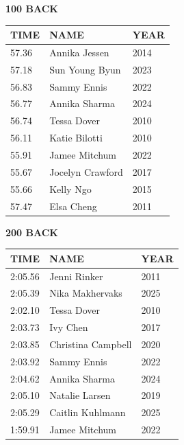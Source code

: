 \begin{table}[H]
\centering
\begin{minipage}[t]{0.48\textwidth}
\centering
\textbf{100 BACK}\\[0.1cm]
\begin{tabular}{@{}p{1.8cm}p{2.8cm}p{1.2cm}@{}}
\hline
    \textbf{TIME} & \textbf{NAME} & \textbf{YEAR} \\
\hline
    57.36 & Annika Jessen & 2014 \\
    57.18 & Sun Young Byun & 2023 \\
    56.83 & Sammy Ennis & 2022 \\
    56.77 & Annika Sharma & 2024 \\
    56.74 & Tessa Dover & 2010 \\
    56.11 & Katie Bilotti & 2010 \\
    55.91 & Jamee Mitchum & 2022 \\
    55.67 & Jocelyn Crawford & 2017 \\
    55.66 & Kelly Ngo & 2015 \\
    57.47 & Elsa Cheng & 2011 \\
\hline
\end{tabular}
\end{minipage}\hfill
\begin{minipage}[t]{0.48\textwidth}
\centering
\textbf{200 BACK}\\[0.1cm]
\begin{tabular}{@{}p{1.8cm}p{2.8cm}p{1.2cm}@{}}
\hline
    \textbf{TIME} & \textbf{NAME} & \textbf{YEAR} \\
\hline
    2:05.56 & Jenni Rinker & 2011 \\
    2:05.39 & Nika Makhervaks & 2025 \\
    2:02.10 & Tessa Dover & 2010 \\
    2:03.73 & Ivy Chen & 2017 \\
    2:03.85 & Christina Campbell & 2020 \\
    2:03.92 & Sammy Ennis & 2022 \\
    2:04.62 & Annika Sharma & 2024 \\
    2:05.10 & Natalie Larsen & 2019 \\
    2:05.29 & Caitlin Kuhlmann & 2025 \\
    1:59.91 & Jamee Mitchum & 2022 \\
\hline
\end{tabular}
\end{minipage}
\end{table}

